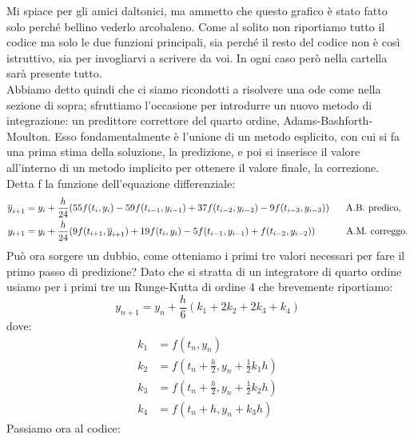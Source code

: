 \documentclass[10pt,a4paper]{article}
\begin{document}
Mi spiace per gli amici daltonici, ma ammetto che questo grafico è stato fatto solo perché bellino vederlo arcobaleno. Come al solito non riportiamo tutto il codice ma solo le due funzioni principali, sia perché il resto del codice non è così istruttivo, sia per invogliarvi a scrivere da voi. In ogni caso però nella cartella sarà presente tutto. \\
Abbiamo detto quindi che ci siamo ricondotti a risolvere una ode come nella sezione di sopra; sfruttiamo l'occasione per introdurre un nuovo metodo di integrazione: un predittore correttore del quarto ordine, Adams-Bashforth-Moulton. Esso fondamentalmente è l'unione di un metodo esplicito, con cui si fa una prima stima della soluzione, la predizione, e poi si inserisce il valore all'interno di un metodo implicito per ottenere il valore finale, la correzione. Detta f la funzione dell'equazione differenziale:
\begin{align}
\overline{y}_{i+1}&=y_i + \frac{h}{24}(55f(t_i,y_i) - 59f(t_{i-1},y_{i-1}) + 37f(t_{i-2},y_{i-2})-9f(t_{i-3},y_{i-3}))\hspace{5 mm} \text{ A.B. predico,}\\
y_{i+1}&=y_i + \frac{h}{24}(9f(t_{i+1},\overline{y}_{i+1})+19f(t_{i},y_{i})-5f(t_{i-1},y_{i-1})+f(t_{i-2},y_{i-2})) \hspace{11.5 mm} \text{A.M. correggo.}
\end{align}
Può ora sorgere un dubbio, come otteniamo i primi tre valori necessari per fare il primo passo di predizione? Dato che si stratta di un integratore di quarto ordine usiamo per i primi tre un Runge-Kutta di ordine 4 che brevemente riportiamo:
\begin{equation}
y_{n+1} = y_n + \frac{h}{6}(k_1 + 2k_2 + 2k_3 + k_4)
\end{equation}
dove:
\begin{align*}
k_1 &= f(t_n, y_n)\\
k_2 &= f(t_n + \frac{h}{2}, y_n + \frac{1}{2} k_1 h)\\
k_3 &= f(t_n + \frac{h}{2}, y_n + \frac{1}{2} k_2 h)\\
k_4 &= f(t_n + h, y_n + k_3 h)
\end{align*}
Passiamo ora al codice:
\end{document}
